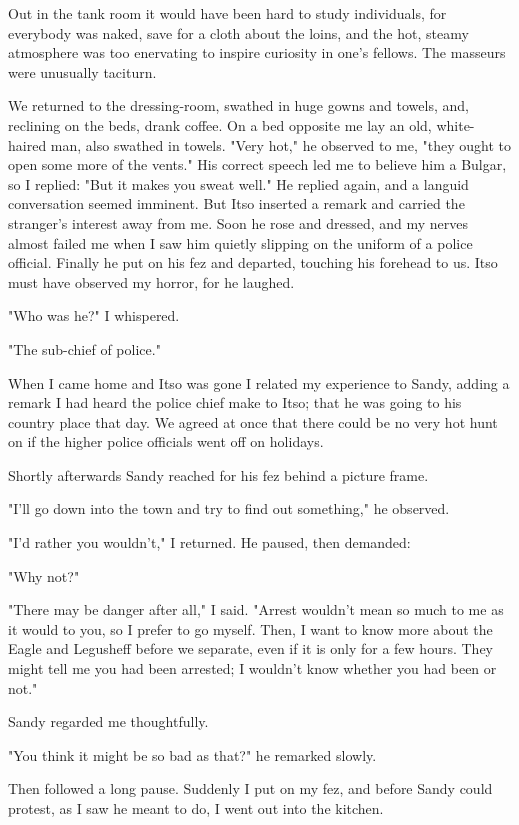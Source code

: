 \documentclass[a5paper,12pt]{book}
\begin{document}
Out in the tank room it would have been hard to study individuals, for everybody was naked, save for a cloth about the loins, and the hot, steamy atmosphere was too enervating to inspire curiosity in one’s fellows. The masseurs were unusually taciturn.

We returned to the dressing-room, swathed in huge gowns and towels, and, reclining on the beds, drank coffee. On a bed opposite me lay an old, white-haired man, also swathed in towels.
"Very hot," he observed to me, "they ought to open some more of the vents." His correct speech led me to believe him a Bulgar, so I replied: "But it makes you sweat well." He replied again, and a languid conversation seemed imminent. But Itso inserted a remark and carried the stranger’s interest away from me. Soon he rose and dressed, and my nerves almost failed me when I saw him quietly slipping on the uniform of a police official. Finally he put on his fez and departed, touching his forehead to us. Itso must have observed my horror, for he laughed.

"Who was he?" I whispered.

"The sub-chief of police."

When I came home and Itso was gone I related my experience to Sandy, adding a remark I had heard the police chief make to Itso; that he was going to his country place that day. We agreed at once that there could be no very hot hunt on if the higher police officials went off on holidays.

Shortly afterwards Sandy reached for his fez behind a picture frame.

"I’ll go down into the town and try to find out something," he observed.

"I’d rather you wouldn’t," I returned. He paused, then demanded:

"Why not?"

"There may be danger after all," I said. "Arrest wouldn’t mean so much to me as it would to you, so I prefer to go myself. Then, I want to know more about the Eagle and Legusheff before we separate, even if it is only for a few hours. They might tell me you had been arrested; I wouldn’t know whether you had been or not."

Sandy regarded me thoughtfully.

"You think it might be so bad as that?" he remarked slowly.

Then followed a long pause. Suddenly I put on my fez, and before Sandy could protest, as I saw he meant to do, I went out into the kitchen.
\end{document}
